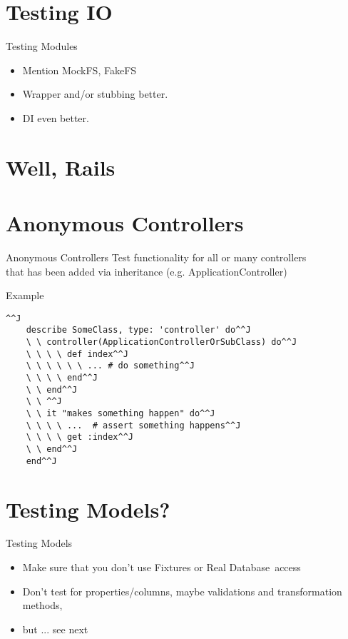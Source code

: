 \documentclass[style=paintings,display=slidesnotes,clock]{powerdot}
\begin{document}
\section{Testing IO}
\begin{note}{Testing Modules}
	\begin{itemize}
		\item Mention MockFS, FakeFS
		\item Wrapper and/or stubbing better.
		\item DI even better.
	\end{itemize}
\end{note}
\section{Well, Rails}
\section{Anonymous Controllers}
\begin{note}{Anonymous Controllers}
	Test functionality for all or many controllers \\
	that has been added via inheritance (e.g. ApplicationController)
\end{note}
\begin{slide}{Example}
	\begin{lstlisting}[frame=shadowbox]^^J
	describe SomeClass, type: 'controller' do^^J
	\ \ controller(ApplicationControllerOrSubClass) do^^J
	\ \ \ \ def index^^J
	\ \ \ \ \ \ ... # do something^^J
	\ \ \ \ end^^J
	\ \ end^^J
	\ \ ^^J
	\ \ it "makes something happen" do^^J
	\ \ \ \ ...  # assert something happens^^J
	\ \ \ \ get :index^^J
	\ \ end^^J
	end^^J
	\end{lstlisting}
\end{slide}
\section{Testing Models?}
\begin{note}{Testing Models}
	\begin{itemize}
		\item Make sure that you don't use Fixtures or Real Database\texttrademark\  access
		\item Don't test for properties/columns, maybe validations and transformation methods, 
		\item but ... see next
	\end{itemize}
\end{note}
\end{document}
